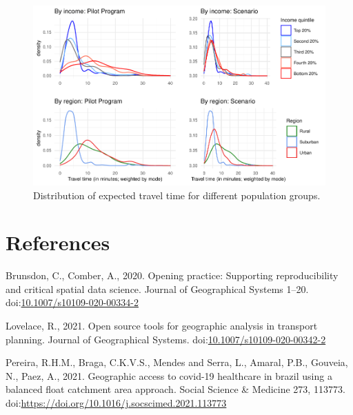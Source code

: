 \documentclass[]{elsarticle} %
\begin{document}
\begin{figure}

{\centering \includegraphics{Accessibility-Vaccination-Sites-Hamilton_files/figure-latex/figure-results-1} 

}

\caption{\label{fig:results}Distribution of expected travel time for different population groups.}\label{fig:figure-results}
\end{figure}

\hypertarget{references}{%
\section*{References}\label{references}}

\hypertarget{refs}{}
\leavevmode\hypertarget{ref-Brunsdon2020opening}{}%
Brunsdon, C., Comber, A., 2020. Opening practice: Supporting
reproducibility and critical spatial data science. Journal of
Geographical Systems 1--20.
doi:\href{https://doi.org/10.1007/s10109-020-00334-2}{10.1007/s10109-020-00334-2}

\leavevmode\hypertarget{ref-Lovelace2021open}{}%
Lovelace, R., 2021. Open source tools for geographic analysis in
transport planning. Journal of Geographical Systems.
doi:\href{https://doi.org/10.1007/s10109-020-00342-2}{10.1007/s10109-020-00342-2}

\leavevmode\hypertarget{ref-Pereira2021geographic}{}%
Pereira, R.H.M., Braga, C.K.V.S., Mendes and Serra, L., Amaral, P.B.,
Gouveia, N., Paez, A., 2021. Geographic access to covid-19 healthcare in
brazil using a balanced float catchment area approach. Social Science \&
Medicine 273, 113773.
doi:\href{https://doi.org/https://doi.org/10.1016/j.socscimed.2021.113773}{https://doi.org/10.1016/j.socscimed.2021.113773}
\end{document}
